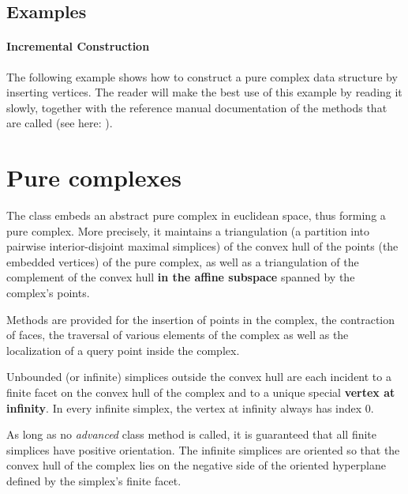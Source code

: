 {{%

\subsection{Examples\label{triangulation:tds:examples}}
 
\paragraph{Incremental Construction}
The following example shows how to construct a pure complex data structure by
inserting vertices. The reader will make the best use of this example by
reading it slowly, together with the reference manual documentation of the
methods that are called (see here: ).




\section{Pure complexes}

The class  embeds an abstract pure
complex in euclidean space, thus forming a pure complex. More precisely, it
maintains a triangulation (a partition into pairwise interior-disjoint maximal
simplices) of the convex hull of the points (the embedded vertices) of the
pure complex, as well as a triangulation of the complement of the convex hull
\textbf{in the affine subspace} spanned by the complex's points.

Methods are provided for the insertion of points in the complex, the
contraction of faces, the traversal of various elements of the complex
as well as the localization of a query point inside the complex.

Unbounded (or infinite) simplices outside the convex hull are each incident to
a finite facet on the convex hull of the complex and to a unique special
\textbf{vertex at infinity}. In every infinite simplex, the vertex at infinity
always has index $0$.

As long as no \emph{advanced} class method is called, it is guaranteed that
all finite simplices have positive orientation. The infinite simplices are
oriented so that the convex hull of the complex lies on the negative side of
the oriented hyperplane defined by the simplex's finite facet.


}}
